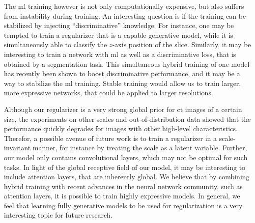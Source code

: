 \documentclass[../ml-tct.tex]{subfiles}
\begin{document}
The \gls{ml} training however is not only computationally expensive, but also suffers from instability during training.
An interesting question is if the training can be stabilized by injecting \enquote{discriminative} knowledge.
For instance, one may be tempted to train a regularizer that is a capable generative model, while it is simultaneously able to classify the \( z \)-axis position of the slice.
Similarly, it may be interesting to train a network with \gls{ml} as well as a discriminative loss, that is obtained by a segmentation task.
This simultaneous hybrid training of one model has recently been shown to boost discriminative performance, and it may be a way to stabilize the \gls{ml} training.
Stable training would allow us to train larger, more expressive networks, that could be applied to larger resolutions.

Although our regularizer is a very strong global prior for \gls{ct} images of a certain size, the experiments on other scales and out-of-distribution data showed that the performance quickly degrades for images with other high-level characteristics.
Therefor, a possible avenue of future work is to train a regularizer in a scale-invariant manner, for instance by treating the scale as a latent variable.
Further, our model only contains convolutional layers, which may not be optimal for such tasks.
In light of the global receptive field of our model, it may be interesting to include attention layers, that are inherently global.
We believe that by combining hybrid training with recent advances in the neural network community, such as attention layers, it is possible to train highly expressive models.
In general, we feel that learning fully generative models to be used for regularization is a very interesting topic for future research.
\end{document}
